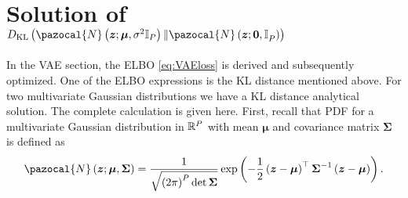 
\section{Solution of $\KL{\pazocal{N}\left(\boldsymbol{z}; \boldsymbol{\mu},\sigma^2\mathbb{I}_P  \right) }{\pazocal{N}\left(\boldsymbol{z}; \boldsymbol{0},\mathbb{I}_P^{}  \right)}$}
In the VAE section, the ELBO \eqref{eq:VAEloss} is derived and subsequently optimized. One of the ELBO expressions is the KL distance mentioned above. For two multivariate Gaussian distributions we have a KL distance analytical solution. The complete calculation is given here. First, recall that PDF for a multivariate Gaussian distribution in $\mathbb{R}^P$ with mean $\boldsymbol{\mu}$ and covariance matrix $\boldsymbol{\Sigma}$ is defined as
\begin{equation}
    \pazocal{N}\left(\boldsymbol{z}; \boldsymbol{\mu},\boldsymbol{\Sigma}  \right) = \frac{1}{\sqrt{\left(2\pi\right)^P\det\boldsymbol{\Sigma}}}\exp\left(-\frac{1}{2}\left(\boldsymbol{z} - \boldsymbol{\mu}\right)^\top\boldsymbol{\Sigma}^{-1}\left(\boldsymbol{z} - \boldsymbol{\mu}\right) \right).
\end{equation}


